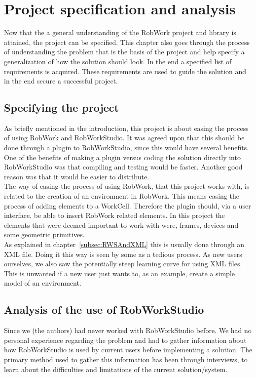 \section{Project specification and analysis}
\label{sec:projectSpecification}
Now that the a general understanding of the RobWork project and library is attained, the project can be specified. This chapter also goes through the process of understanding the problem that is the basis of the project and help specify a generalization of how the solution should look. In the end a specified list of requirements is acquired. These requirements are used to guide the solution and in the end secure a successful project.

\subsection{Specifying the project}
As briefly mentioned in the introduction, this project is about easing the process of using RobWork and RobWorkStudio. It was agreed upon that this should be done through a plugin to RobWorkStudio, since this would have several benefits. One of the benefits of making a plugin versus coding the solution directly into RobWorkStudio was that compiling and testing would be faster. Another good reason was that it would be easier to distribute.\\

The way of easing the process of using RobWork, that this project works with, is related to the creation of an environment in RobWork. This means easing the process of adding elements to a WorkCell. Therefore the plugin should, via a user interface, be able to insert RobWork related elements. In this project the elements that were deemed important to work with were, frames, devices and some geometric primitives.\\

As explained in chapter~\ref{subsec:RWSAndXML} this is usually done through an XML file. Doing it this way is seen by some as a tedious process. As new users ourselves, we also saw the potentially steep learning curve for using XML files. This is unwanted if a new user just wants to, as an example, create a simple model of an environment.

\subsection{Analysis of the use of RobWorkStudio}
Since we (the authors) had never worked with RobWorkStudio before. We had no personal experience regarding the problem and had to gather information about how RobWorkStudio is used by current users before implementing a solution. The primary method used to gather this information has been through interviews, to learn about the difficulties and limitations of the current solution/system.

